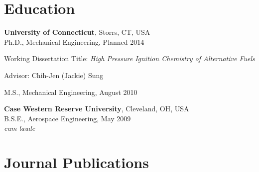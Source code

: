 \section{Education}

\textbf{University of Connecticut}, Storrs, CT, USA\\
Ph.D., Mechanical Engineering, Planned 2014
        \begin{innerlist}
        \item[] Working Dissertation Title: \textit{High Pressure
                Ignition Chemistry of Alternative Fuels}
        \item[] Advisor: Chih-Jen (Jackie) Sung
        \end{innerlist}

\vspace{0.1in}
M.S., Mechanical Engineering, August 2010

\vspace{0.2in}

\textbf{Case Western Reserve University}, Cleveland, OH, USA\\
B.S.E., Aerospace Engineering, May 2009\\
\textit{cum laude}

\section{Journal Publications}

